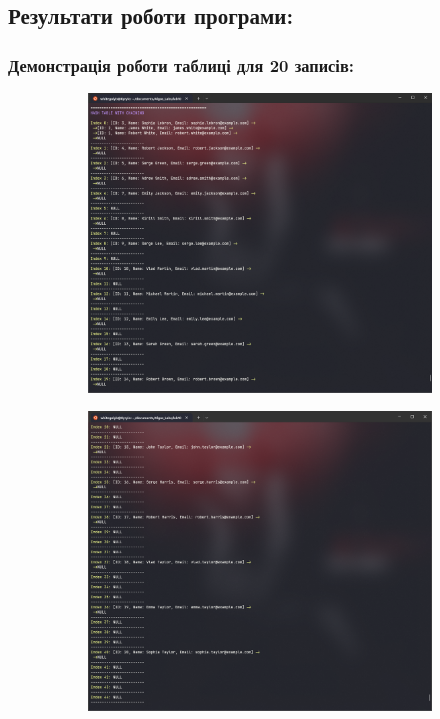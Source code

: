 \clearpage

\subsection{Результати роботи програми:}

\subsubsection{Демонстрація роботи таблиці для 20 записів:}

\begin{figure}[h!]
  \centering
  \begin{subfigure}[t]{0.45\textwidth}
      \centering
      \includegraphics[width=\textwidth]{reports/algos/lab10/assets/1.png}
  \end{subfigure}
  \hfill
  \begin{subfigure}[t]{0.45\textwidth}
      \centering
      \includegraphics[width=\textwidth]{reports/algos/lab10/assets/2.png}
  \end{subfigure}
  

\end{figure}
